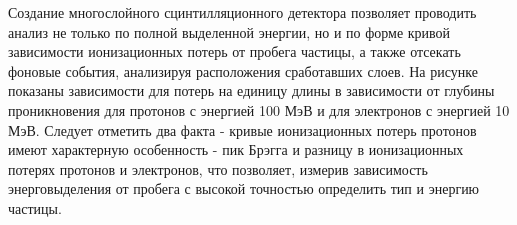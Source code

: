 
Создание многослойного сцинтилляционного детектора позволяет проводить анализ не только по полной выделенной энергии, но и по форме кривой зависимости   ионизационных потерь  от пробега частицы, а также отсекать фоновые события, анализируя расположения сработавших слоев. На рисунке показаны зависимости для потерь на единицу длины в зависимости от глубины проникновения для протонов с энергией 100 МэВ и для электронов с энергией 10 МэВ. Следует отметить два факта - кривые ионизационных потерь протонов имеют характерную особенность - пик Брэгга и разницу в ионизационных потерях протонов и электронов, что позволяет, измерив зависимость энерговыделения от пробега с высокой точностью определить тип и энергию частицы. 

